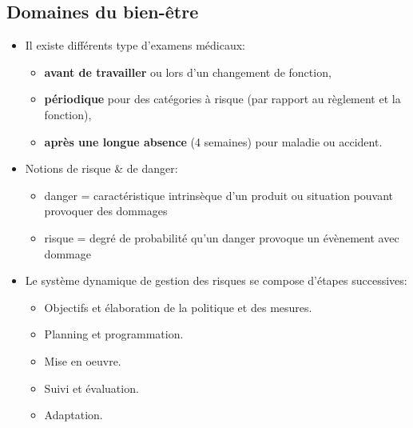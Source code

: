 \documentclass[a4paper]{article}
\begin{document}
\subsection{Domaines du bien-être}





\begin{itemize}





\item Il existe différents type d’examens médicaux:
\begin{itemize}
    \item \textbf{avant de travailler} ou lors d’un changement de fonction,
    \item \textbf{périodique} pour des catégories à risque (par rapport au règlement et la fonction),
    \item \textbf{après une longue absence} (4 semaines) pour maladie ou accident.
\end{itemize}





\item Notions de risque \& de danger:
\begin{itemize}
    \item danger = caractéristique intrinsèque d’un produit ou situation pouvant provoquer des dommages
    \item risque = degré de probabilité qu’un danger provoque un évènement avec dommage
\end{itemize}





\item Le système dynamique de gestion des risques se compose d’étapes successives:
\begin{itemize}
    \item Objectifs et élaboration de la politique et des mesures.
    \item Planning et programmation.
    \item Mise en oeuvre.
    \item Suivi et évaluation.
    \item Adaptation.
\end{itemize}






\end{itemize}
\end{document}
